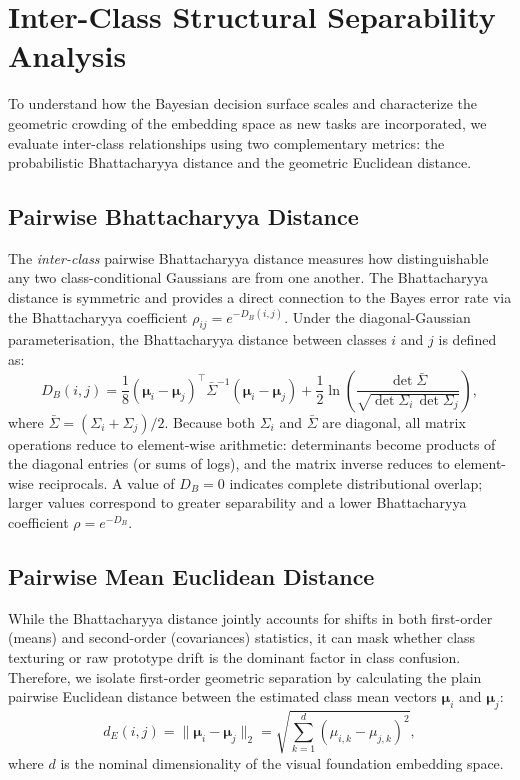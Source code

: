 \section{Inter-Class Structural Separability Analysis}
\label{sec:method:separability}

To understand how the Bayesian decision surface scales and characterize the geometric crowding of the embedding space as new tasks are incorporated, we evaluate inter-class relationships using two complementary metrics: the probabilistic Bhattacharyya distance and the geometric Euclidean distance.

\subsection{Pairwise Bhattacharyya Distance}
\label{sec:method:separability:bhattacharyya}

The \emph{inter-class} pairwise Bhattacharyya distance measures how distinguishable any two class-conditional Gaussians are from one another.
The Bhattacharyya distance is symmetric and provides a direct connection to the Bayes error rate via the Bhattacharyya coefficient $\rho_{ij} = e^{-D_B(i,j)}$.
Under the diagonal-Gaussian parameterisation, the Bhattacharyya distance between classes $i$ and $j$ is defined as:
\begin{equation}
	D_B(i,j)
	= \frac{1}{8}(\boldsymbol{\mu}_i - \boldsymbol{\mu}_j)^{\top}
	\bar{\Sigma}^{-1}
	(\boldsymbol{\mu}_i - \boldsymbol{\mu}_j)
	+ \frac{1}{2}\ln\!\left(
	\frac{\det\bar{\Sigma}}{\sqrt{\det\Sigma_i\,\det\Sigma_j}}
	\right),
	\label{eq:interclass_bhattacharyya}
\end{equation}
where $\bar{\Sigma} = (\Sigma_i + \Sigma_j)/2$.
Because both $\Sigma_i$ and $\bar{\Sigma}$ are diagonal, all matrix operations reduce to element-wise arithmetic: determinants become products of the diagonal entries (or sums of logs), and the matrix inverse reduces to element-wise reciprocals.
A value of $D_B=0$ indicates complete distributional overlap; larger values correspond to greater separability and a lower Bhattacharyya coefficient $\rho = e^{-D_B}$.

\subsection{Pairwise Mean Euclidean Distance}
\label{sec:method:separability:euclidean}

While the Bhattacharyya distance jointly accounts for shifts in both first-order (means) and second-order (covariances) statistics, it can mask whether class texturing or raw prototype drift is the dominant factor in class confusion. Therefore, we isolate first-order geometric separation by calculating the plain pairwise Euclidean distance between the estimated class mean vectors $\boldsymbol{\mu}_i$ and $\boldsymbol{\mu}_j$:
\begin{equation}
	d_E(i,j) = \|\boldsymbol{\mu}_i - \boldsymbol{\mu}_j\|_2 = \sqrt{\sum_{k=1}^{d} (\mu_{i,k} - \mu_{j,k})^2},
	\label{eq:interclass_euclidean}
\end{equation}
where $d$ is the nominal dimensionality of the visual foundation embedding space.

